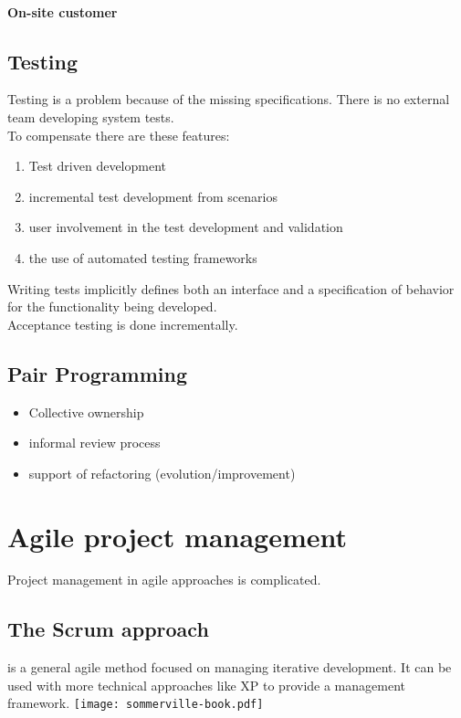 \documentclass[a4paper,11pt,twocolumn]{report}
\begin{document}
    \paragraph{On-site customer}
    \subsection{Testing}
    Testing is a problem because of the missing specifications. There is no
    external team developing system tests.\\
    To compensate there are these features:
    \begin{enumerate}
        \item Test driven development
        \item incremental test development from scenarios
        \item user involvement in the test development and validation
        \item the use of automated testing frameworks
    \end{enumerate}
    Writing tests implicitly defines both an interface and a specification of
    behavior for the functionality being developed.\\
    Acceptance testing is done incrementally.
    \subsection{Pair Programming}
    \begin{itemize}
        \item Collective ownership
        \item informal review process
        \item support of refactoring (evolution/improvement)
    \end{itemize}
    \section{Agile project management}
    Project management in agile approaches is complicated.
    \subsection{The Scrum approach}
    is a general agile method focused on managing iterative development. It can
    be used with more technical approaches like XP to provide a management
    framework.
    \texttt{[image: sommerville-book.pdf]}
\end{document}
